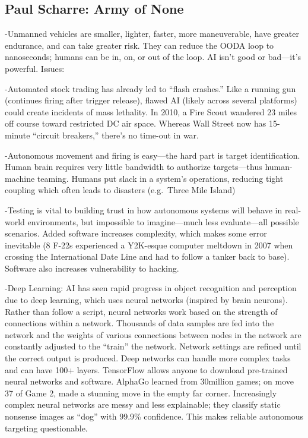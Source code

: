 \documentclass[
]{article}
\begin{document}
\hypertarget{paul-scharre-army-of-none}{%
\subsection{Paul Scharre: Army of
None}\label{paul-scharre-army-of-none}}

-Unmanned vehicles are smaller, lighter, faster, more maneuverable, have
greater endurance, and can take greater risk. They can reduce the OODA
loop to nanoseconds; humans can be in, on, or out of the loop. AI isn't
good or bad---it's powerful. Issues:

-Automated stock trading has already led to ``flash crashes.'' Like a
running gun (continues firing after trigger release), flawed AI (likely
across several platforms) could create incidents of mass lethality. In
2010, a Fire Scout wandered 23 miles off course toward restricted DC air
space. Whereas Wall Street now has 15-minute ``circuit breakers,''
there's no time-out in war.

-Autonomous movement and firing is easy---the hard part is target
identification. Human brain requires very little bandwidth to authorize
targets---thus human-machine teaming. Humans put slack in a system's
operations, reducing tight coupling which often leads to disasters
(e.g.~Three Mile Island)

-Testing is vital to building trust in how autonomous systems will
behave in real-world environments, but impossible to imagine---much less
evaluate---all possible scenarios. Added software increases complexity,
which makes some error inevitable (8 F-22s experienced a Y2K-esque
computer meltdown in 2007 when crossing the International Date Line and
had to follow a tanker back to base). Software also increases
vulnerability to hacking.

-Deep Learning: AI has seen rapid progress in object recognition and
perception due to deep learning, which uses neural networks (inspired by
brain neurons). Rather than follow a script, neural networks work based
on the strength of connections within a network. Thousands of data
samples are fed into the network and the weights of various connections
between nodes in the network are constantly adjusted to the ``train''
the network. Network settings are refined until the correct output is
produced. Deep networks can handle more complex tasks and can have 100+
layers. TensorFlow allows anyone to download pre-trained neural networks
and software. AlphaGo learned from 30million games; on move 37 of Game
2, made a stunning move in the empty far corner. Increasingly complex
neural networks are messy and less explainable; they classify static
nonsense images as ``dog'' with 99.9\% confidence. This makes reliable
autonomous targeting questionable.
\end{document}
